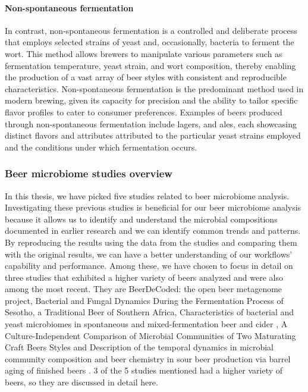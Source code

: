            \paragraph*{Non-spontaneous fermentation}
                In contrast, non-spontaneous fermentation is a controlled and deliberate process that employs selected strains of yeast and, occasionally, bacteria to ferment the wort. This method allows brewers to manipulate various parameters such as fermentation temperature, yeast strain, and wort composition, thereby enabling the production of a vast array of beer styles with consistent and reproducible characteristics. Non-spontaneous fermentation is the predominant method used in modern brewing, given its capacity for precision and the ability to tailor specific flavor profiles to cater to consumer preferences. Examples of beers produced through non-spontaneous fermentation include lagers, and ales, each showcasing distinct flavors and attributes attributed to the particular yeast strains employed and the conditions under which fermentation occurs\cite{white2010yeast}.
    
    
        \subsubsection{Beer microbiome studies overview}
            In this thesis, we have picked five studies related to beer microbiome analysis. Investigating these previous studies is beneficial for our beer microbiome analysis because it allows us to identify and understand the microbial compositions documented in earlier research and we can identify common trends and patterns. By reproducing the results using the data from the studies and comparing them with the original results, we can have a better understanding of our workflows' capability and performance. Among these, we have chosen to focus in detail on three studies that exhibited a higher variety of beers analyzed and were also among the most recent. They are BeerDeCoded: the open beer metagenome project\cite{sobel2017beerdecoded}, Bacterial and Fungal Dynamics During the Fermentation Process of Sesotho, a Traditional Beer of Southern Africa\cite{cason2020bacterial}, Characteristics of bacterial and yeast microbiomes in spontaneous and mixed-fermentation beer and cider \cite{tyakht2021characteristics}, A Culture-Independent Comparison of Microbial Communities of Two Maturating Craft Beers Styles\cite{costa2022culture} and Description of the temporal dynamics in microbial community composition and beer chemistry in sour beer production via barrel aging of finished beers \cite{bossaert2021description}. 3 of the 5 studies mentioned had a higher variety of beers, so they are discussed in detail here.
            
